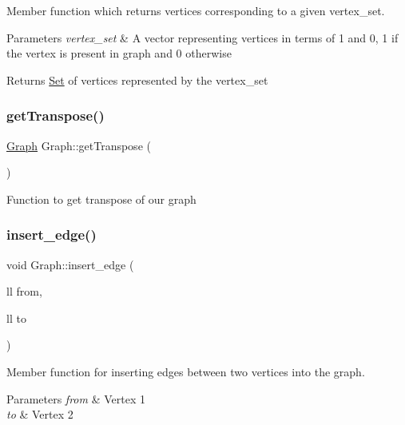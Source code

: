 Member function which returns vertices corresponding to a given vertex\+\_\+set. 


\begin{DoxyParams}{Parameters}
{\em vertex\+\_\+set} & A vector representing vertices in terms of 1 and 0, 1 if the vertex is present in graph and 0 otherwise \\
\hline
\end{DoxyParams}
\begin{DoxyReturn}{Returns}
\hyperlink{classSet}{Set} of vertices represented by the vertex\+\_\+set 
\end{DoxyReturn}
\mbox{\label{classGraph_abdaf0cb08811d4b30f4c85f632e0e181}} 
\subsubsection{\texorpdfstring{get\+Transpose()}{getTranspose()}}
{\footnotesize\ttfamily \hyperlink{classGraph}{Graph} Graph\+::get\+Transpose (\begin{DoxyParamCaption}{ }\end{DoxyParamCaption})}

Function to get transpose of our graph \mbox{\label{classGraph_af8290de63bf9336aea89bf7bca9e054b}} 
\subsubsection{\texorpdfstring{insert\+\_\+edge()}{insert\_edge()}}
{\footnotesize\ttfamily void Graph\+::insert\+\_\+edge (\begin{DoxyParamCaption}\item[{ll}]{from,  }\item[{ll}]{to }\end{DoxyParamCaption})\hspace{0.3cm}{\ttfamily [inline]}}



Member function for inserting edges between two vertices into the graph. 


\begin{DoxyParams}{Parameters}
{\em from} & Vertex 1 \\
\hline
{\em to} & Vertex 2 \\
\hline
\end{DoxyParams}
\mbox{\label{classGraph_aa9bb861babacf50c211afc72b5f424fb}} 
